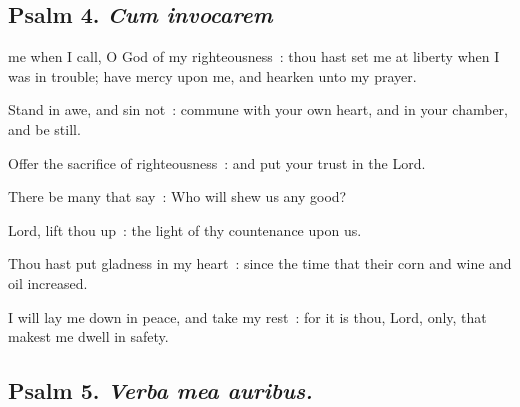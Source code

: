 \subsection{Psalm 4. \textit{Cum invocarem}}


 me when I call, O God of my righteousness~: thou hast set me at liberty when I was in trouble; have mercy upon me, and hearken unto my prayer.\par
{}
Stand in awe, and sin not~: commune with your own heart, and in your chamber, and be still.\par
{}Offer the sacrifice of righteousness~: and put your trust in the Lord.\par
{}There be many that say~: Who will shew us any good?\par
{}Lord, lift thou up~: the light of thy countenance upon us.\par
{}Thou hast put gladness in my heart~: since the time that their corn and wine and oil increased.\par
{}I will lay me down in peace, and take my rest~: for it is thou, Lord, only, that makest me dwell in safety.\par

\subsection{Psalm 5. \textit{Verba mea auribus.}}


